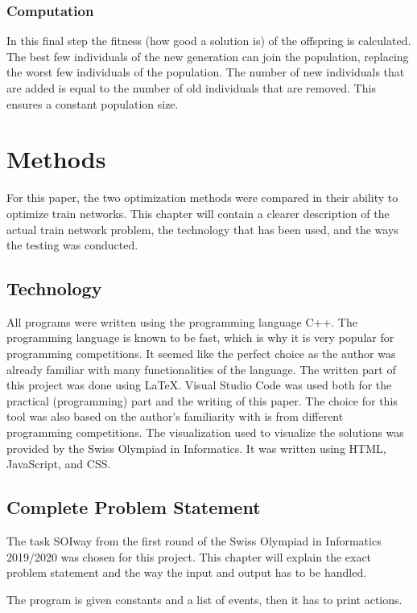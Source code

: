 \documentclass[10pt]{scrreprt}
\begin{document}
\subsection{Computation}
In this final step the fitness (how good a solution is) of the offspring is calculated. The best few individuals of the new generation can join the population, replacing the worst few individuals of the population. The number of new individuals that are added is equal to the number of old individuals that are removed. This ensures a constant population size.



\chapter{Methods}

For this paper, the two optimization methods were compared in their ability to optimize train networks. This chapter will contain a clearer description of the actual train network problem, the technology that has been used, and the ways the testing was conducted.


\section{Technology}
All programs were written using the programming language C++. The programming language is known to be fast, which is why it is very popular for programming competitions. It seemed like the perfect choice as the author was already familiar with many functionalities of the language.
 The written part of this project was done using LaTeX. Visual Studio Code was used both for the practical (programming) part and the writing of this paper. The choice for this tool was also based on the author's familiarity with is from different programming competitions. 
 The visualization used to visualize the solutions was provided by the Swiss Olympiad in Informatics. It was written using HTML, JavaScript, and CSS.

\section{Complete Problem Statement}

The task SOIway \cite{SOIway} from the first round of the Swiss Olympiad in Informatics 2019/2020 was chosen for this project. This chapter will explain the exact problem statement and the way the input and output has to be handled.

The program is given constants and a list of events, then it has to print actions.
\end{document}
